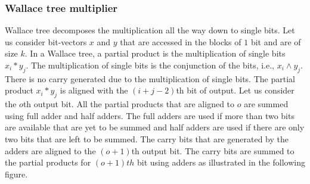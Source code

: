 \subsubsection{Wallace tree multiplier\cite{wallace}}
%
Wallace tree decomposes the multiplication all the way down to single bits.
%
Let us consider bit-vectors $x$ and $y$ that are accessed in the blocks of $1$
bit and are of size $k$.
%
In a Wallace tree, a partial product is the multiplication of single
bits $x_i*y_j$.
%
The multiplication of single bits is the conjunction of the bits, i.e.,
$x_i \land y_j$.
%
There is no carry generated due to the multiplication of single bits.
%
The partial product $x_i*y_j$ is aligned with the $(i+j-2)$th bit of output.
%
Let us consider the $o$th output bit.
%
All the partial products that are aligned to $o$ are summed using full adder 
and half adders.
%
The full adders are used
if more than two bits are available that are yet to be summed
and half adders are used if there are only two bits that are left to be summed.
%
The carry bits that are generated by the adders are aligned to the $(o+1)$th output bit.
%
The carry bits are summed to the partial products for $(o+1)th$ bit
using adders as illustrated in the following figure.

\begin{center}
\end{center}

